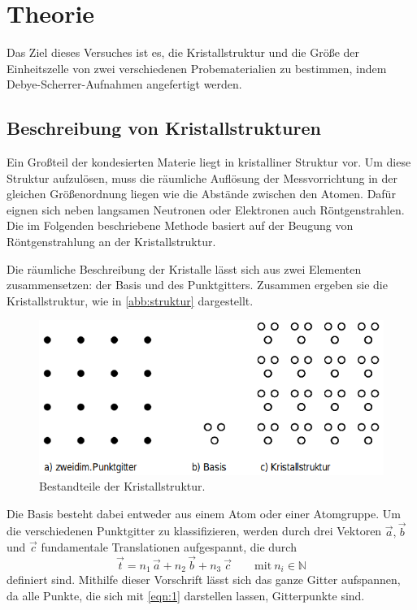 \section{Theorie}
Das Ziel dieses Versuches ist es, die Kristallstruktur und die Größe der Einheitszelle
von zwei verschiedenen Probematerialien zu bestimmen, indem Debye-Scherrer-Aufnahmen
angefertigt werden.

\subsection{Beschreibung von Kristallstrukturen}
Ein Großteil der kondesierten Materie liegt in kristalliner Struktur vor.
Um diese Struktur aufzulösen, muss die räumliche Auflösung der Messvorrichtung in der
gleichen Größenordnung liegen wie die Abstände zwischen den Atomen. Dafür eignen sich
neben langsamen Neutronen oder Elektronen auch Röntgenstrahlen. Die im Folgenden
beschriebene Methode basiert auf der Beugung von Röntgenstrahlung an der Kristallstruktur.

Die räumliche Beschreibung der Kristalle lässt sich aus zwei Elementen zusammensetzen:
der Basis und des Punktgitters. Zusammen ergeben sie die Kristallstruktur, wie in
\autoref{abb:struktur} dargestellt.
\begin{figure}
  \centering
  \includegraphics[scale=0.5]{content/pics/basis_gitter.png}
  \caption{Bestandteile der Kristallstruktur. \cite{anleitung}}
  \label{abb:struktur}
\end{figure}
Die Basis besteht dabei entweder aus einem Atom oder einer Atomgruppe. Um die verschiedenen
Punktgitter zu klassifizieren, werden durch drei Vektoren $\vec{a}, \vec{b}$ und $\vec{c}$
fundamentale Translationen aufgespannt, die durch
\begin{equation}
  \vec{t} = n_1 \, \vec{a} + n_2 \, \vec{b} + n_3 \ \vec{c} \qquad \text{mit} \ n_i \in \mathbb{N}
  \label{eqn:1}
\end{equation}
definiert sind. Mithilfe dieser Vorschrift lässt sich das ganze Gitter aufspannen, da
alle Punkte, die sich mit \eqref{eqn:1} darstellen lassen, Gitterpunkte sind.

